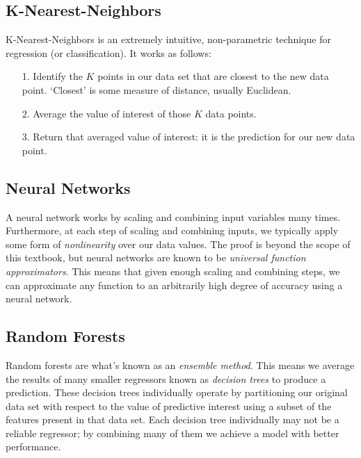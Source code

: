 \subsection{K-Nearest-Neighbors}
K-Nearest-Neighbors is an extremely intuitive, non-parametric technique for regression (or classification). It works as follows:

\begin{itemize}
    \item[1.] Identify the $K$ points in our data set that are closest to the new data point. `Closest' is some measure of distance, usually Euclidean.
    \item[2.] Average the value of interest of those $K$ data points.
    \item[3.] Return that averaged value of interest: it is the prediction for our new data point.
\end{itemize}


\subsection{Neural Networks}
A neural network works by scaling and combining input variables many times. Furthermore, at each step of scaling and combining inputs, we typically apply some form of \textit{nonlinearity} over our data values. The proof is beyond the scope of this textbook, but neural networks are known to be \textit{universal function approximators}. This means that given enough scaling and combining steps, we can approximate any function to an arbitrarily high degree of accuracy using a neural network.

\subsection{Random Forests}
Random forests are what's known as an \textit{ensemble method}. This means we average the results of many smaller regressors known as \textit{decision trees} to produce a prediction. These decision trees individually operate by partitioning our original data set with respect to the value of predictive interest using a subset of the features present in that data set. Each decision tree individually may not be a reliable regressor; by combining many of them we achieve a model with better performance.

